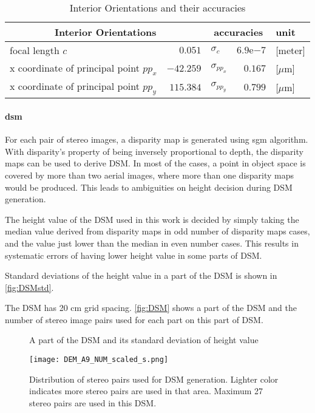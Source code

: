 \begin{table}%
    \centering
    \begin{tabular}{lr|lr|l}
    \toprule
    \multicolumn{2}{c|}{Interior Orientations}  & \multicolumn{2}{c|}{accuracies} & unit\\
    \midrule
    focal length $c$                       &   $0.051$ & $\sigma_c$      & $6.9\mathrm{e}{-7}$ & [meter]\\
    x coordinate of principal point $pp_x$ & $-42.259$ & $\sigma_{pp_x}$ & $0.167$             &[$\mu$m]\\
    x coordinate of principal point $pp_y$ & $115.384$ & $\sigma_{pp_y}$ & $0.799$             &[$\mu$m]\\
    \bottomrule
    \end{tabular}
    \caption{Interior Orientations and their accuracies}
    \label{tab:IOaccuracy}
\end{table}

\clearpage
\paragraph{\gls{dsm}}
For each pair of stereo images, a disparity map is generated using \gls{sgm} algorithm. With disparity's property of being inversely proportional to depth, the disparity maps can be used to derive DSM. In most of the cases, a point in object space is covered by more than two aerial images, where more than one disparity maps would be produced. This leads to ambiguities on height decision during DSM generation.

The height value of the DSM used in this work is decided by simply taking the median value derived from disparity maps in odd number of disparity maps cases, and the value just lower than the median in even number cases. This results in systematic errors of having lower height value in some parts of DSM.

Standard deviations of the height value in a part of the DSM is shown in \cref{fig:DSMstd}.

The DSM has 20 cm grid spacing. \cref{fig:DSM} shows a part of the DSM and the number of stereo image pairs used for each part on this part of DSM.

\begin{figure}%
  \centering
  \caption{A part of the DSM and its standard deviation of height value}
  \label{fig:DSM}
%
  \centering
  \texttt{[image: DEM\_A9\_NUM\_scaled\_s.png]}
  \caption{Distribution of stereo pairs used for DSM generation. Lighter color indicates more stereo pairs are used in that area. Maximum 27 stereo pairs are used in this DSM.}
  \label{fig:DSMnumber}
\end{figure}


